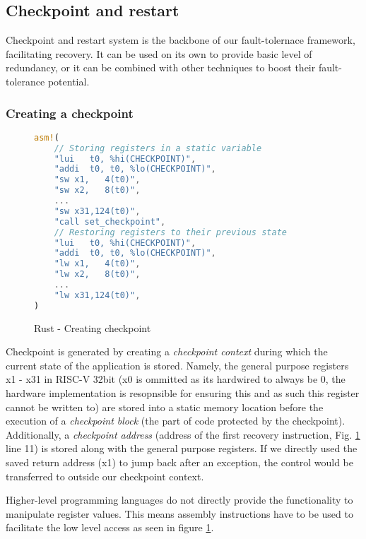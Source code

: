 \subsection{Checkpoint and restart}

Checkpoint and restart system is the backbone of our fault-tolernace framework, facilitating recovery. It can be used on its own to provide basic level of redundancy, or it can be combined with other techniques to boost their fault-tolerance potential.

\subsubsection{Creating a checkpoint} \label{sec:creating_checkpoint}

\begin{figure}[!h]
\begin{lstlisting}[language=Rust]
asm!(
    // Storing registers in a static variable
    "lui   t0, %hi(CHECKPOINT)",
    "addi  t0, t0, %lo(CHECKPOINT)",
    "sw x1,   4(t0)",
    "sw x2,   8(t0)",
    ...
    "sw x31,124(t0)",
    "call set_checkpoint",
    // Restoring registers to their previous state
    "lui   t0, %hi(CHECKPOINT)",
    "addi  t0, t0, %lo(CHECKPOINT)",
    "lw x1,   4(t0)",
    "lw x2,   8(t0)",
    ...
    "lw x31,124(t0)",
)
\end{lstlisting}
\caption{Rust - Creating checkpoint}
\label{fig:rust_create_checkpoint}
\end{figure}

Checkpoint is generated by creating a \textit{checkpoint context} during which the current state of the application is stored. Namely, the general purpose registers x1 - x31 in RISC-V 32bit (x0 is ommitted as its hardwired to always be 0, the hardware implementation is resopnsible for ensuring this and as such this register cannot be written to) are stored into a static memory location before the execution of a \textit{checkpoint block} (the part of code protected by the checkpoint). Additionally, a \textit{checkpoint address} (address of the first recovery instruction, Fig. \ref{fig:rust_create_checkpoint} line 11) is stored along with the general purpose registers. If we directly used the saved return address (x1) to jump back after an exception, the control would be transferred to outside our checkpoint context. 

Higher-level programming languages do not directly provide the functionality to manipulate register values. This means assembly instructions have to be used to facilitate the low level access as seen in figure \ref{fig:rust_create_checkpoint}.

